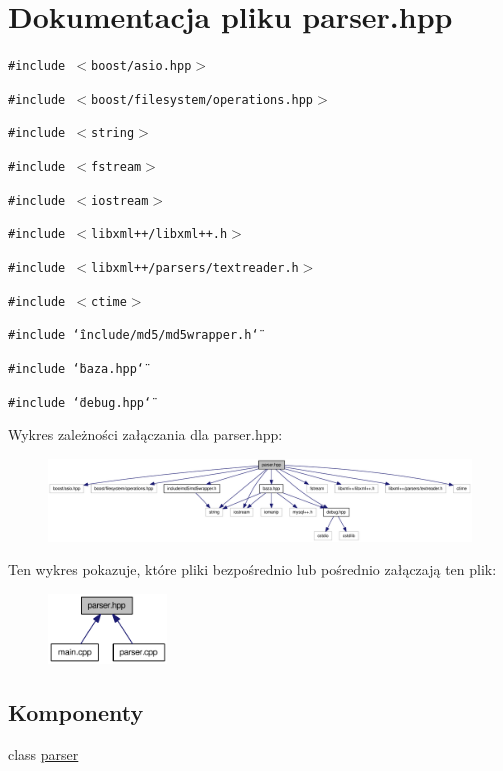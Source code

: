 \hypertarget{a00015}{
\section{Dokumentacja pliku parser.hpp}
\label{dd/d1b/a00015}
}
{\tt \#include $<$boost/asio.hpp$>$}\par
{\tt \#include $<$boost/filesystem/operations.hpp$>$}\par
{\tt \#include $<$string$>$}\par
{\tt \#include $<$fstream$>$}\par
{\tt \#include $<$iostream$>$}\par
{\tt \#include $<$libxml++/libxml++.h$>$}\par
{\tt \#include $<$libxml++/parsers/textreader.h$>$}\par
{\tt \#include $<$ctime$>$}\par
{\tt \#include \char`\"{}include/md5/md5wrapper.h\char`\"{}}\par
{\tt \#include \char`\"{}baza.hpp\char`\"{}}\par
{\tt \#include \char`\"{}debug.hpp\char`\"{}}\par


Wykres zależności załączania dla parser.hpp:\nopagebreak
\begin{figure}[H]
\begin{center}
\leavevmode
\includegraphics[width=420pt]{d4/dca/a00048}
\end{center}
\end{figure}


Ten wykres pokazuje, które pliki bezpośrednio lub pośrednio załączają ten plik:\nopagebreak
\begin{figure}[H]
\begin{center}
\leavevmode
\includegraphics[width=89pt]{d2/dee/a00049}
\end{center}
\end{figure}
\subsection*{Komponenty}
\begin{CompactItemize}
\item 
class \hyperlink{a00005}{parser}
\end{CompactItemize}
